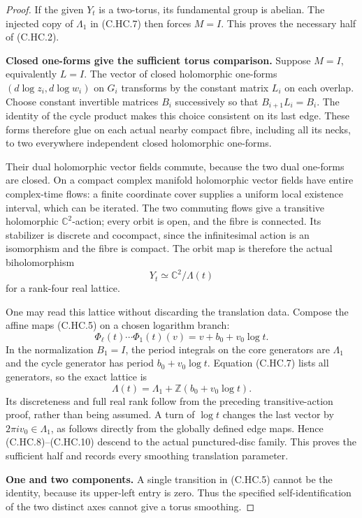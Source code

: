 \begin{proof}
If the given $Y_t$ is a two-torus, its fundamental
group is abelian. The injected copy of $\Lambda_1$
in (C.HC.7) then forces $M=I$.
This proves the necessary half of (C.HC.2).

\par\medskip\noindent\textbf{Closed one-forms give the sufficient torus comparison.}
Suppose $M=I$, equivalently $L=I$.
The vector of closed holomorphic one-forms
$(d\log z_i,d\log w_i)$ on $G_i$ transforms
by the constant matrix $L_i$ on each overlap.
Choose constant invertible matrices $B_i$
successively so that $B_{i+1}L_i=B_i$.
The identity of the cycle product makes this
choice consistent on its last edge.
These forms therefore glue on each actual
nearby compact fibre, including all its necks,
to two everywhere independent closed holomorphic
one-forms.

Their dual holomorphic vector fields commute,
because the two dual one-forms are closed.
On a compact complex manifold holomorphic
vector fields have entire complex-time flows:
a finite coordinate cover supplies a uniform
local existence interval, which can be iterated.
The two commuting flows give a transitive
holomorphic $\mathbb C^2$-action; every orbit
is open, and the fibre is connected.
Its stabilizer is discrete and cocompact,
since the infinitesimal action is an
isomorphism and the fibre is compact.
The orbit map is therefore the actual
biholomorphism
\[
                  Y_t\simeq\mathbb C^2/\Lambda(t)
\tag{C.HC.8}
\]
for a rank-four real lattice.

One may read this lattice without discarding
the translation data. Compose the affine
maps (C.HC.5) on a chosen logarithm branch:
\[
                    \Phi_\ell(t)\cdots\Phi_1(t)(v)
                          =v+b_0+v_0\log t.
\tag{C.HC.9}
\]
In the normalization $B_1=I$, the period
integrals on the core generators are
$\Lambda_1$ and the cycle generator has
period $b_0+v_0\log t$. Equation (C.HC.7)
lists all generators, so the exact lattice is
\[
                 \Lambda(t)=
                    \Lambda_1+\mathbb Z(b_0+v_0\log t).
\tag{C.HC.10}
\]
Its discreteness and full real rank follow
from the preceding transitive-action proof,
rather than being assumed. A turn of $\log t$
changes the last vector by $2\pi i v_0\in\Lambda_1$,
as follows directly from the globally defined
edge maps. Hence (C.HC.8)--(C.HC.10) descend
to the actual punctured-disc family. This proves
the sufficient half and records every smoothing
translation parameter.

\par\medskip\noindent\textbf{One and two components.}
A single transition in (C.HC.5) cannot be the
identity, because its upper-left entry is zero.
Thus the specified self-identification of the
two distinct axes cannot give a torus smoothing.


\end{proof}
